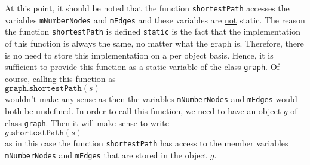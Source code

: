 At this point, it should be noted that the function \texttt{shortestPath} accesses the variables
\texttt{mNumberNodes} and \texttt{mEdges} 
and these variables are \underline{not} static.  The reason the function \texttt{shortestPath} is
defined \texttt{static} is the fact that the implementation of this function is always the same, no
matter what the graph is.  Therefore, 
there is no need to store this implementation on a per object basis.  Hence, it is sufficient to provide this
function as a static variable of the class \texttt{graph}.  Of course, calling this function as
\\[0.2cm]
\hspace*{1.3cm}
$\texttt{graph.shortestPath}(s)$
\\[0.2cm]
wouldn't make any sense as then the variables \texttt{mNumberNodes} and \texttt{mEdges} would both
be undefined.  In order to call this function, we need to have an object $g$ of class \texttt{graph}.
Then it will make sense to write
\\[0.2cm]
\hspace*{1.3cm}
$g\mathtt{.shortestPath}(s)$
\\[0.2cm]
as in this case the function \texttt{shortestPath} has access to the member variables
\texttt{mNumberNodes} and \texttt{mEdges} that are stored in the object $g$.

